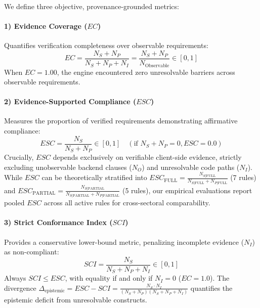 We define three objective, provenance-grounded metrics:

\paragraph{1) Evidence Coverage ($EC$)} Quantifies verification completeness over observable requirements:
\begin{equation}
\label{eq:assessment:ec}
EC = \frac{N_S + N_P}{N_S + N_P + N_I} = \frac{N_S + N_P}{N_{\text{Observable}}} \in [0, 1]
\end{equation}
When $EC = 1.00$, the engine encountered zero unresolvable barriers across observable requirements.

\paragraph{2) Evidence-Supported Compliance ($ESC$)} Measures the proportion of verified requirements demonstrating affirmative compliance:
\begin{equation}
\label{eq:assessment:esc}
ESC = \frac{N_S}{N_S + N_P} \in [0, 1] \quad (\text{if } N_S + N_P = 0, ESC = 0.0)
\end{equation}
Crucially, $ESC$ depends exclusively on verifiable client-side evidence, strictly excluding unobservable backend clauses ($N_O$) and unresolvable code paths ($N_I$). While $ESC$ can be theoretically stratified into $ESC_{\text{FULL}} = \frac{N_{S|\text{FULL}}}{N_{S|\text{FULL}} + N_{P|\text{FULL}}}$ (7 rules) and $ESC_{\text{PARTIAL}} = \frac{N_{S|\text{PARTIAL}}}{N_{S|\text{PARTIAL}} + N_{P|\text{PARTIAL}}}$ (5 rules), our empirical evaluations report pooled $ESC$ across all active rules for cross-sectoral comparability.

\paragraph{3) Strict Conformance Index ($SCI$)} Provides a conservative lower-bound metric, penalizing incomplete evidence ($N_I$) as non-compliant:
\begin{equation}
\label{eq:assessment:sci}
SCI = \frac{N_S}{N_S + N_P + N_I} \in [0, 1]
\end{equation}
Always $SCI \le ESC$, with equality if and only if $N_I = 0$ ($EC = 1.0$). The divergence $\Delta_{\text{epistemic}} = ESC - SCI = \frac{N_S \cdot N_I}{(N_S + N_P)(N_S + N_P + N_I)}$ quantifies the epistemic deficit from unresolvable constructs.

